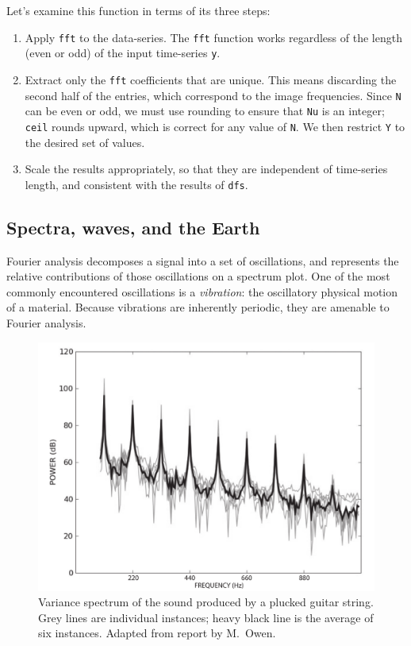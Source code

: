 \documentclass[11pt,twoside,a4paper]{article}
\begin{document}


Let's examine this function in terms of its three steps:
\begin{enumerate}
\item Apply \texttt{fft} to the data-series.  The \texttt{fft}
  function works regardless of the length (even or odd) of the input
  time-series \texttt{y}.
\item Extract only the \texttt{fft} coefficients that are unique.
  This means discarding the second half of the entries, which
  correspond to the image frequencies. Since \texttt{N} can be even or
  odd, we must use rounding to ensure that \texttt{Nu} is an integer;
  \texttt{ceil} rounds upward, which is correct for any value of
  \texttt{N}. We then restrict \texttt{Y} to the desired set of
  values.
\item Scale the results appropriately, so that they are independent of
  time-series length, and consistent with the results of \texttt{dfs}.
\end{enumerate}

\subsection{Spectra, waves, and the Earth}

Fourier analysis decomposes a signal into a set of oscillations, and
represents the relative contributions of those oscillations on a
spectrum plot. One of the most commonly encountered oscillations is a
\textit{vibration}: the oscillatory physical motion of a
material. Because vibrations are inherently periodic, they are
amenable to Fourier analysis.

\begin{figure}
  \centering
  \includegraphics[width=4.5in]{../figs/L16/GuitarOvertones}
  \caption{Variance spectrum of the sound produced by a plucked guitar
    string. Grey lines are individual instances; heavy black line is
    the average of six instances. Adapted from report by
    M.~Owen.\vspace{1cm}}
  \label{fig:guitar}
\end{figure}
\end{document}
